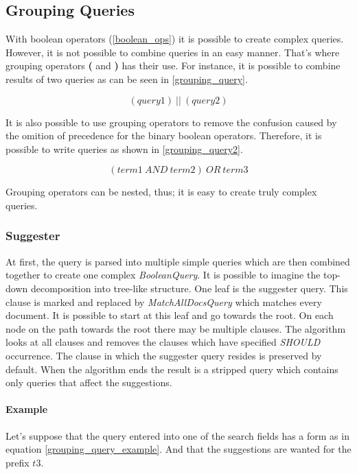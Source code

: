 \subsection{Grouping Queries}
\label{grouping_queries}
With boolean operators (\ref{boolean_ops}) it is possible to create complex queries. However, it is not possible to
combine queries in an easy manner. That's where grouping operators \textbf{(} and \textbf{)} has their use. For instance,
it is possible to combine results of two queries as can be seen in \ref{grouping_query}.

\begin{equation}
\label{grouping_query}
(query1)\ \vert\vert\ (query2)
\end{equation}

It is also possible to use grouping operators to remove the confusion caused by the omition of precedence for the binary
boolean operators. Therefore, it is possible to write queries as shown in \ref{grouping_query2}.

\begin{equation}
\label{grouping_query2}
(term1\ AND\ term2)\ OR\ term3
\end{equation}

Grouping operators can be nested, thus; it is easy to create truly complex queries.

\subsubsection{Suggester}

At first, the query is parsed into multiple simple queries which are then combined together to create one complex
\textit{BooleanQuery}. It is possible to imagine the top-down decomposition into tree-like structure. %
One leaf is the suggester query. This clause is marked and replaced by \textit{MatchAllDocsQuery} which matches every
document. %
It is possible to start at this leaf and go towards the root. On each node on the path towards the root there may be
multiple clauses. The algorithm looks at all clauses and removes the clauses which have specified \textit{SHOULD}
occurrence. The clause in which the suggester query resides is preserved by default. When the algorithm ends the result
is a stripped query which contains only queries that affect the suggestions.

\paragraph{Example}
Let's suppose that the query entered into one of the search fields has a form as in equation \ref{grouping_query_example}.
And that the suggestions are wanted for the prefix $t3$.

